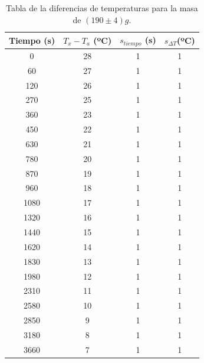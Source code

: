 \documentclass[a4paper]{article}
\begin{document}
\begin{table}[H]
  \centering
    \begin{tabular}{|c|c|c|c|} \hline
    Tiempo (s) & $T_x - T_a$ (ºC) & $s_{tiempo }$ (s) &  $s_{ \Delta T} $(ºC) \\ \hline
    0     & 28    & 1     & 1 \\ \hline
    60    & 27    & 1     & 1 \\ \hline
    120   & 26    & 1     & 1 \\ \hline
    270   & 25    & 1     & 1 \\ \hline
    360   & 23    & 1     & 1 \\ \hline
    450   & 22    & 1     & 1 \\ \hline
    630   & 21    & 1     & 1 \\ \hline
    780   & 20    & 1     & 1 \\ \hline
    870   & 19    & 1     & 1 \\ \hline
    960   & 18    & 1     & 1 \\ \hline
    1080  & 17    & 1     & 1 \\ \hline
    1320  & 16    & 1     & 1 \\ \hline
    1440  & 15    & 1     & 1 \\ \hline
    1620  & 14    & 1     & 1 \\ \hline
    1830  & 13    & 1     & 1 \\ \hline
    1980  & 12    & 1     & 1 \\ \hline
    2310  & 11    & 1     & 1 \\ \hline
    2580  & 10    & 1     & 1 \\ \hline
    2850  & 9     & 1     & 1 \\ \hline
    3180  & 8     & 1     & 1 \\ \hline
    3660  & 7     & 1     & 1 \\ \hline
    \end{tabular}%
     \caption{Tabla de la diferencias de temperaturas para la masa de $(190\pm 4)g$.}
\end{table}%
\end{document}
